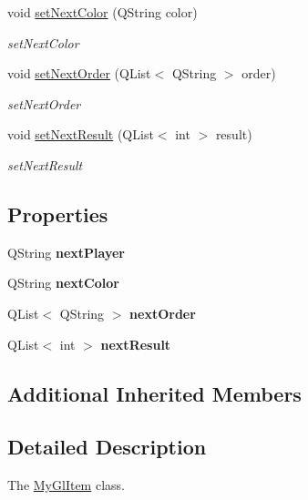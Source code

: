 \begin{DoxyCompactItemize}
void \mbox{\hyperlink{class_my_gl_item_a1d7b760e5da84802e97825c34be7b354}{set\+Next\+Color}} (Q\+String color)
\begin{DoxyCompactList}\small\item\em set\+Next\+Color \end{DoxyCompactList}\item 
void \mbox{\hyperlink{class_my_gl_item_a4bacae91dba178b2cebfdde56cea364c}{set\+Next\+Order}} (Q\+List$<$ Q\+String $>$ order)
\begin{DoxyCompactList}\small\item\em set\+Next\+Order \end{DoxyCompactList}\item 
void \mbox{\hyperlink{class_my_gl_item_ae876b4b064add1a66a8a7dca732ac282}{set\+Next\+Result}} (Q\+List$<$ int $>$ result)
\begin{DoxyCompactList}\small\item\em set\+Next\+Result \end{DoxyCompactList}\end{DoxyCompactItemize}
\subsection*{Properties}
\begin{DoxyCompactItemize}
\item 
\mbox{\label{class_my_gl_item_abc171f46578b349ef427434969ae2220}} 
Q\+String {\bfseries next\+Player}
\item 
\mbox{\label{class_my_gl_item_a0231b71bc8a4bd91b69b498c8f4a9483}} 
Q\+String {\bfseries next\+Color}
\item 
\mbox{\label{class_my_gl_item_a30a8dddc13241d8a04a6fcfb095c7886}} 
Q\+List$<$ Q\+String $>$ {\bfseries next\+Order}
\item 
\mbox{\label{class_my_gl_item_a88bcf9b5549634a7d2d19cecbc81e72d}} 
Q\+List$<$ int $>$ {\bfseries next\+Result}
\end{DoxyCompactItemize}
\subsection*{Additional Inherited Members}


\subsection{Detailed Description}
The \mbox{\hyperlink{class_my_gl_item}{My\+Gl\+Item}} class. 

